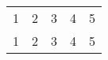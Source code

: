 \documentclass{amsart}
\begin{document}
\begin{tabular}{|c|c|c|c|c|}
1 & 2 & 3  & 4  & 5\\
\hhline{|~|-|~|~|~|}
1 & 2 & 3  & 4  & 5\\
\end{tabular}
\end{document}
